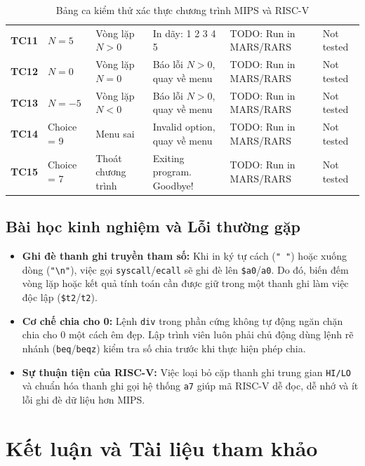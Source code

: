 \documentclass[12pt,a4paper]{article}
\begin{document}
\begin{table}[H]
\begin{tabularx}{\textwidth}{llllXX}
        \textbf{TC11} & $N=5$ & Vòng lặp $N > 0$ & In dãy: 1 2 3 4 5 & TODO: Run in MARS/RARS & Not tested \\
        \textbf{TC12} & $N=0$ & Vòng lặp $N = 0$ & Báo lỗi $N > 0$, quay về menu & TODO: Run in MARS/RARS & Not tested \\
        \textbf{TC13} & $N=-5$ & Vòng lặp $N < 0$ & Báo lỗi $N > 0$, quay về menu & TODO: Run in MARS/RARS & Not tested \\
        \textbf{TC14} & Choice = 9 & Menu sai & Invalid option, quay về menu & TODO: Run in MARS/RARS & Not tested \\
        \textbf{TC15} & Choice = 7 & Thoát chương trình & Exiting program. Goodbye! & TODO: Run in MARS/RARS & Not tested \\
        \bottomrule
    \end{tabularx}
    \caption{Bảng ca kiểm thử xác thực chương trình MIPS và RISC-V}
    \label{tab:test-cases}
\end{table}

\subsection{Bài học kinh nghiệm và Lỗi thường gặp}
\begin{itemize}
    \item \textbf{Ghi đè thanh ghi truyền tham số:} Khi in ký tự cách (\texttt{" "}) hoặc xuống dòng (\texttt{"\textbackslash n"}), việc gọi \texttt{syscall}/\texttt{ecall} sẽ ghi đè lên \texttt{\$a0}/\texttt{a0}. Do đó, biến đếm vòng lặp hoặc kết quả tính toán cần được giữ trong một thanh ghi làm việc độc lập (\texttt{\$t2}/\texttt{t2}).
    \item \textbf{Cơ chế chia cho 0:} Lệnh \texttt{div} trong phần cứng không tự động ngăn chặn chia cho 0 một cách êm đẹp. Lập trình viên luôn phải chủ động dùng lệnh rẽ nhánh (\texttt{beq}/\texttt{beqz}) kiểm tra số chia trước khi thực hiện phép chia.
    \item \textbf{Sự thuận tiện của RISC-V:} Việc loại bỏ cặp thanh ghi trung gian \texttt{HI/LO} và chuẩn hóa thanh ghi gọi hệ thống \texttt{a7} giúp mã RISC-V dễ đọc, dễ nhớ và ít lỗi ghi đè dữ liệu hơn MIPS.
\end{itemize}

\section{Kết luận và Tài liệu tham khảo}
\end{document}
